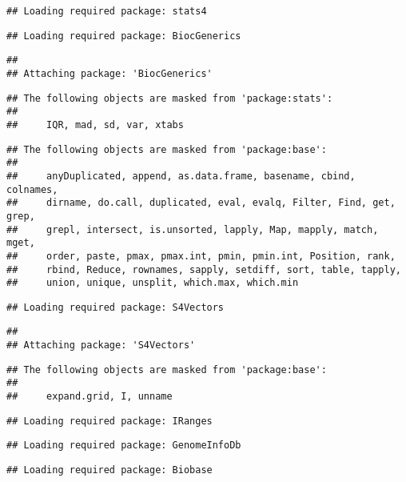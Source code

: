 \documentclass[
  oneside]{book}
\begin{document}
\begin{verbatim}
## Loading required package: stats4
\end{verbatim}

\begin{verbatim}
## Loading required package: BiocGenerics
\end{verbatim}

\begin{verbatim}
## 
## Attaching package: 'BiocGenerics'
\end{verbatim}

\begin{verbatim}
## The following objects are masked from 'package:stats':
## 
##     IQR, mad, sd, var, xtabs
\end{verbatim}

\begin{verbatim}
## The following objects are masked from 'package:base':
## 
##     anyDuplicated, append, as.data.frame, basename, cbind, colnames,
##     dirname, do.call, duplicated, eval, evalq, Filter, Find, get, grep,
##     grepl, intersect, is.unsorted, lapply, Map, mapply, match, mget,
##     order, paste, pmax, pmax.int, pmin, pmin.int, Position, rank,
##     rbind, Reduce, rownames, sapply, setdiff, sort, table, tapply,
##     union, unique, unsplit, which.max, which.min
\end{verbatim}

\begin{verbatim}
## Loading required package: S4Vectors
\end{verbatim}

\begin{verbatim}
## 
## Attaching package: 'S4Vectors'
\end{verbatim}

\begin{verbatim}
## The following objects are masked from 'package:base':
## 
##     expand.grid, I, unname
\end{verbatim}

\begin{verbatim}
## Loading required package: IRanges
\end{verbatim}

\begin{verbatim}
## Loading required package: GenomeInfoDb
\end{verbatim}

\begin{verbatim}
## Loading required package: Biobase
\end{verbatim}
\end{document}
